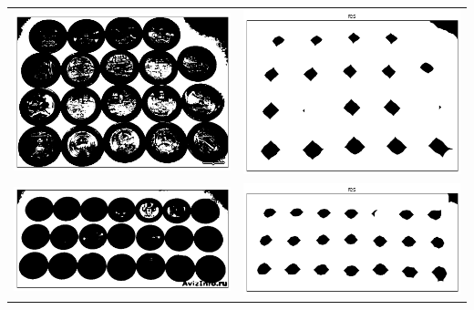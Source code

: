 \documentclass[12pt, a4paper]{article}
\begin{document}
\begin{center}
		\begin{tabular}{c c}
			\includegraphics[width=8cm]{Money_4_bin.png} & \includegraphics[width=8cm]{Money_4_res.png} \\
			\includegraphics[width=8cm]{Money_6_bin.png} & \includegraphics[width=8cm]{Money_6_res.png} \\

\end{tabular}
\end{center}
\end{document}
